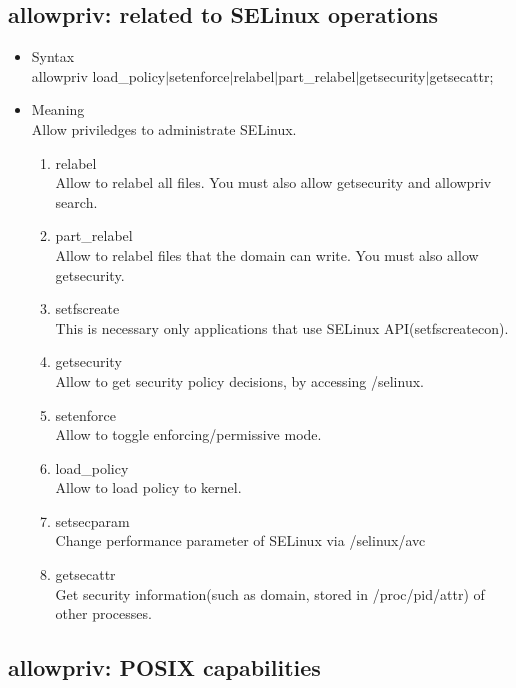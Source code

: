 \documentclass{article}
\begin{document}
\subsection{allowpriv: related to SELinux operations}
\begin{itemize}
 \item Syntax\\
       allowpriv load\_policy$\mid$setenforce$\mid$relabel$\mid$part\_relabel$\mid$getsecurity$\mid$getsecattr;
 \item Meaning\\
       Allow priviledges to administrate SELinux.
       \begin{enumerate}
	\item relabel\\
	      Allow to relabel all files. You must also allow
	      getsecurity and allowpriv search.
	\item part\_relabel\\
	      Allow to relabel files that the domain can write. You must
	      also allow getsecurity. 
	\item setfscreate\\
	      This is necessary only applications that use SELinux API(setfscreatecon).
	\item getsecurity\\
	      Allow to get security policy decisions, by accessing /selinux.
	\item setenforce\\        
	      Allow to toggle enforcing/permissive mode.
	\item load\_policy\\                    
	      Allow to load policy to kernel.
	\item setsecparam\\
	      Change performance parameter of SELinux via /selinux/avc
	\item getsecattr\\
	      Get security information(such as domain, stored in /proc/pid/attr) of other processes.
       \end{enumerate}
\end{itemize}

\subsection{allowpriv: POSIX  capabilities}
\end{document}
